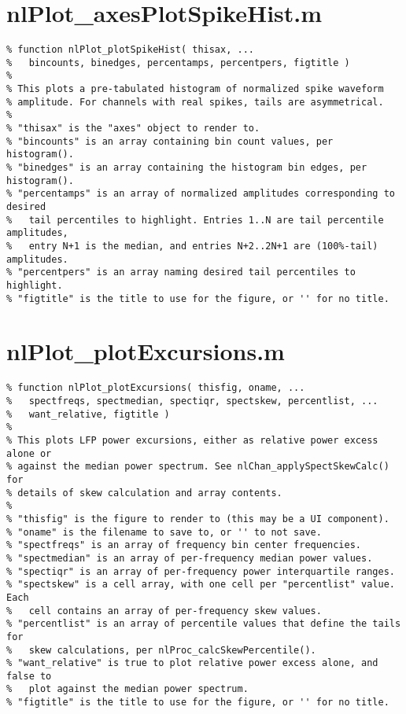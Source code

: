 \section{nlPlot\_axesPlotSpikeHist.m}

\begin{verbatim}
% function nlPlot_plotSpikeHist( thisax, ...
%   bincounts, binedges, percentamps, percentpers, figtitle )
%
% This plots a pre-tabulated histogram of normalized spike waveform
% amplitude. For channels with real spikes, tails are asymmetrical.
%
% "thisax" is the "axes" object to render to.
% "bincounts" is an array containing bin count values, per histogram().
% "binedges" is an array containing the histogram bin edges, per histogram().
% "percentamps" is an array of normalized amplitudes corresponding to desired
%   tail percentiles to highlight. Entries 1..N are tail percentile amplitudes,
%   entry N+1 is the median, and entries N+2..2N+1 are (100%-tail) amplitudes.
% "percentpers" is an array naming desired tail percentiles to highlight.
% "figtitle" is the title to use for the figure, or '' for no title.
\end{verbatim}

\section{nlPlot\_plotExcursions.m}

\begin{verbatim}
% function nlPlot_plotExcursions( thisfig, oname, ...
%   spectfreqs, spectmedian, spectiqr, spectskew, percentlist, ...
%   want_relative, figtitle )
%
% This plots LFP power excursions, either as relative power excess alone or
% against the median power spectrum. See nlChan_applySpectSkewCalc() for
% details of skew calculation and array contents.
%
% "thisfig" is the figure to render to (this may be a UI component).
% "oname" is the filename to save to, or '' to not save.
% "spectfreqs" is an array of frequency bin center frequencies.
% "spectmedian" is an array of per-frequency median power values.
% "spectiqr" is an array of per-frequency power interquartile ranges.
% "spectskew" is a cell array, with one cell per "percentlist" value. Each
%   cell contains an array of per-frequency skew values.
% "percentlist" is an array of percentile values that define the tails for
%   skew calculations, per nlProc_calcSkewPercentile().
% "want_relative" is true to plot relative power excess alone, and false to
%   plot against the median power spectrum.
% "figtitle" is the title to use for the figure, or '' for no title.
\end{verbatim}

